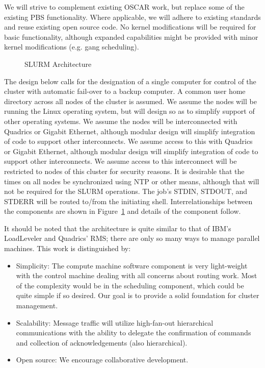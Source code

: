 We will strive to complement existing OSCAR work, but replace some of the
existing PBS functionality. Where applicable, we will adhere to existing
standards and reuse existing open source code. No kernel modifications will be
required for basic functionality, although expanded capabilities might be
provided with minor kernel modifications (e.g. gang scheduling). 

\begin{figure}
\caption{SLURM Architecture}
\label{arch}
\end{figure}
The design below calls for the designation of a single computer for control of
the cluster with automatic fail-over to a backup computer. A common user home
directory across all nodes of the cluster is assumed. We assume the nodes will
be running the Linux operating system, but will design so as to simplify
support of other operating systems. We assume the nodes will be interconnected
with Quadrics or Gigabit Ethernet, although modular design will simplify
integration of code to support other interconnects. We assume access to this
with Quadrics or Gigabit Ethernet, although modular design will simplify
integration of code to support other interconnects. We assume access to this
interconnect will be restricted to nodes of this cluster for security reasons.
It is desirable that the times on all nodes be synchronized using NTP or other
means, although that will not be required for the SLURM operations. The job's
STDIN, STDOUT, and STDERR will be routed to/from the initiating shell.
Interrelationships between the components are shown in Figure~\ref{arch}
and details of the component follow. 

It should be noted that the architecture is quite similar to that of IBM's
LoadLeveler and Quadrics' RMS; there are only so many ways to manage parallel
machines. This work is distinguished by:
\begin{itemize}
\item Simplicity: The compute machine software component is very light-weight with
the control machine dealing with all concerns about routing work. Most of the
complexity would be in the scheduling component, which could be quite simple if
so desired. Our goal is to provide a solid foundation for cluster management.
\item Scalability: Message traffic will utilize high-fan-out hierarchical
communications with the ability to delegate the confirmation of commands and
collection of acknowledgements (also hierarchical).
\item Open source: We encourage collaborative development.
\end{itemize}

